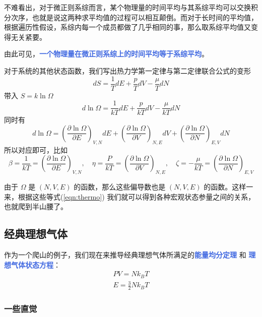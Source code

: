 \documentclass[hyperref,UTF-8]{ctexart}
\newcommand{\0}{\boldsymbol{0}}
\begin{document}
不难看出，对于微正则系综而言，某个物理量的时间平均与其系综平均可以交换积分次序，也就是说这两种求平均值的过程可以相互颠倒。而对于长时间的平均值，根据遍历性假设，系综内每一个成员都做了几乎相同的事，那么取系综平均值又变得无关紧要\cite{Pathria}。

由此可见，\textcolor{RoyalBlue}{\textbf{\kaishu 一个物理量在微正则系综上的时间平均等于系综平均}}。

对于系统的其他状态函数，我们写出热力学第一定律与第二定律联合公式的变形
\[
    dS = \frac{1}{T} dE + \frac{p}{T} dV - \frac{\mu}{T} dN
\]
带入 $S = k \ln \Omega$ 
\begin{equation}
    d\ln \Omega = \frac{1}{kT} dE + \frac{p}{kT} dV - \frac{\mu}{kT} dN
\end{equation}
同时有
\begin{equation}
    d\ln \Omega = \left(\frac{\partial \ln \Omega}{\partial E}\right)_{V,N} dE + \left(\frac{\partial \ln \Omega}{\partial V}\right)_{N,E} dV + \left(\frac{\partial \ln \Omega}{\partial N}\right)_{E,V} dN
\end{equation}
所以对应即可，比如
\begin{equation}\label{eqn:thermo}
    \beta = \frac{1}{kT} =  \left(\frac{\partial \ln \Omega}{\partial E}\right)_{V,N},\quad \eta  = \frac{P}{kT}  = \left(\frac{\partial \ln \Omega}{\partial V}\right)_{N,E},\quad \zeta = -\frac{\mu}{kT}  = \left(\frac{\partial \ln \Omega}{\partial N}\right)_{E,V}
\end{equation}

由于 $\Omega$ 是 $(N,V,E)$ 的函数，那么这些偏导数也是 $(N,V,E)$ 的函数。这样一来，根据这些等式(\ref*{eqn:thermo}) 我们就可以得到各种宏观状态参量之间的关系，也就爬到半山腰了。



\subsection{经典理想气体}

作为一个爬山的例子，我们现在来推导经典理想气体所满足的\textcolor{RoyalBlue}{\textbf{\kaishu 能量均分定理}} 和 \textcolor{RoyalBlue}{\textbf{\kaishu 理想气体状态方程}}：
\begin{align*}
    PV = Nk_BT \\
    E = \frac{3}{2}N k_B T
\end{align*}

\subsubsection{一些直觉}
\end{document}
